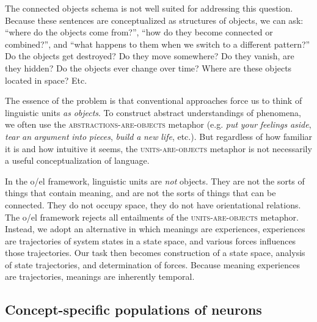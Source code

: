   The connected objects schema is not well suited for addressing this question. Because these sentences are conceptualized as structures of objects, we can ask: “where do the objects come from?”, “how do they become connected or combined?”, and “what happens to them when we switch to a different pattern?” Do the objects get destroyed? Do they move somewhere? Do they vanish, are they hidden? Do the objects ever change over time? Where are these objects located in space? Etc.

  The essence of the problem is that conventional approaches force us to think of linguistic units \textit{as} \textit{objects}. To construct abstract understandings of phenomena, we often use the \textsc{abstractions-}\textsc{are}\textsc{{}-objects} metaphor (e.g. \textit{put} \textit{your} \textit{feelings} \textit{aside}, \textit{tear} \textit{an} \textit{argument} \textit{into} \textit{pieces}, \textit{build} \textit{a} \textit{new} \textit{life}, etc.). But regardless of how familiar it is and how intuitive it seems, the \textsc{units}\textsc{{}-are-}\textsc{objects} metaphor is not necessarily a useful conceptualization of language. 

  In the o/el framework, linguistic units are \textit{not} objects. They are not the sorts of things that contain meaning, and are not the sorts of things that can be connected. They do not occupy space, they do not have orientational relations. The o/el framework rejects all entailments of the \textsc{units}\textsc{{}-are-}\textsc{objects} metaphor. Instead, we adopt an alternative in which meanings are experiences, experiences are trajectories of system states in a state space, and various forces influences those trajectories. Our task then becomes construction of a state space, analysis of state trajectories, and determination of forces. Because meaning experiences are trajectories, meanings are inherently temporal. 

\subsection{Concept-specific populations of neurons}

